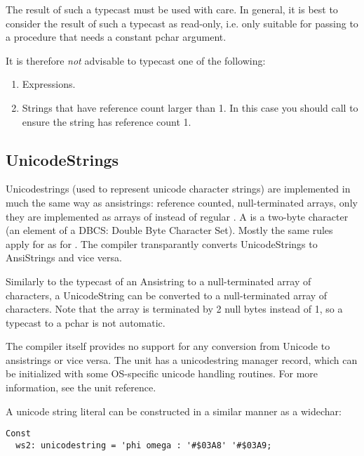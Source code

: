 The result of such a typecast must be used with care. In general, it is best
to consider the result of such a typecast as read-only, i.e. only suitable for
passing to a procedure that needs a constant pchar argument.

It is therefore {\em not} advisable to typecast one of the following:
\begin{enumerate}
\item Expressions.
\item Strings that have reference count larger than 1.
In this case you should call  to ensure the 
string has reference count 1.
\end{enumerate}

\subsection{UnicodeStrings}
Unicodestrings (used to represent unicode character strings) are implemented in much 
the same way as ansistrings: reference counted, null-terminated arrays, only they 
are implemented as arrays of  instead of regular .
A  is a two-byte character (an element of a DBCS: Double Byte
Character Set). Mostly the same rules apply for  as for
. The compiler transparantly converts UnicodeStrings to
AnsiStrings and vice versa. 

Similarly to the typecast of an Ansistring to a  null-terminated
 array of characters, a UnicodeString can be converted to a 
 null-terminated array of characters. Note that the
 array is terminated by 2 null bytes instead of
1, so a typecast to a pchar is not automatic.

The compiler itself provides no support for any conversion from Unicode to
ansistrings or vice versa. The  unit has a unicodestring manager
record, which can be initialized with some OS-specific unicode handling
routines. For more information, see the  unit reference.

A unicode string literal can be constructed in a similar manner as a widechar:
\begin{verbatim}
Const
  ws2: unicodestring = 'phi omega : '#$03A8' '#$03A9;
\end{verbatim}


